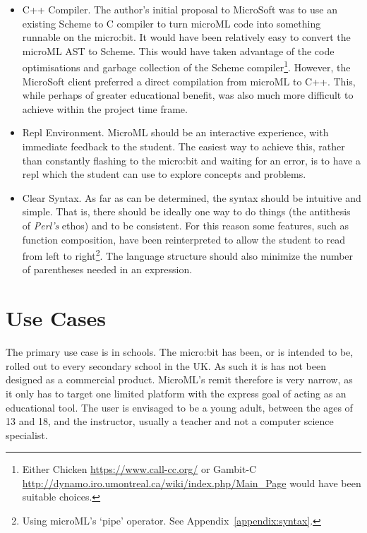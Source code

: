 \documentclass[12pt, a4paper]{report}
\begin{document}
\begin{itemize}
    \item C++ Compiler. The author's initial proposal to MicroSoft was to use an existing Scheme
        to C compiler to turn microML code into something runnable on the micro:bit. It would have
        been relatively easy to convert the microML AST to Scheme. This would have taken advantage of
        the code optimisations and garbage collection of the Scheme compiler\footnote{Either Chicken
        \url{https://www.call-cc.org/} or Gambit-C \url{http://dynamo.iro.umontreal.ca/wiki/index.php/Main_Page}
        would have been suitable choices.}. However, the MicroSoft client preferred a direct
        compilation from microML to C++. This, while perhaps of greater educational benefit, was also
        much more difficult to achieve within the project time frame.
    \item Repl Environment. MicroML should be an interactive experience, with immediate feedback to
        the student. The easiest way to achieve this, rather than constantly flashing to the
        micro:bit and waiting for an error, is to have a repl which the student can use to explore
        concepts and problems. 
    \item Clear Syntax. As far as can be determined, the syntax should be intuitive and simple. That
        is, there should be ideally one way to do things (the antithesis of \textit{Perl's} ethos)
        and to be consistent. For this reason some features, such as function composition, have been
        reinterpreted to allow the student to read from left to right\footnote{Using microML's
        `pipe' operator. See Appendix~\ref{appendix:syntax}.}. The language structure should also
        minimize the number of parentheses needed in an expression.
\end{itemize}

\section{Use Cases}
The primary use case is in schools. The micro:bit has been, or is intended to be, rolled out to
every secondary school in the UK\@. As such it is has not been designed as a commercial product.
MicroML's remit therefore is very narrow, as it only has to target one limited platform with the
express goal of acting as an educational tool. The user is envisaged to be a young adult, between
the ages of 13 and 18, and the instructor, usually a teacher and not a computer science specialist.
\end{document}
